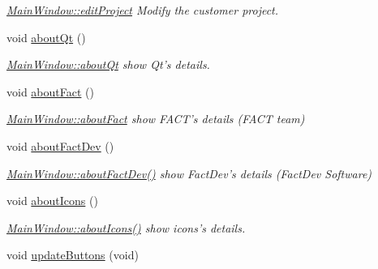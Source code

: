 \begin{DoxyCompactItemize}
\begin{DoxyCompactList}\small\item\em \hyperlink{classGui_1_1MainWindow_adade8f873eb855b2ca0bb851c91cc5a9}{Main\-Window\-::edit\-Project} Modify the customer project. \end{DoxyCompactList}\item 
\hypertarget{classGui_1_1MainWindow_a6df8072789ea8ec81ca2dd8fa78a4b01}{void \hyperlink{classGui_1_1MainWindow_a6df8072789ea8ec81ca2dd8fa78a4b01}{about\-Qt} ()}\label{classGui_1_1MainWindow_a6df8072789ea8ec81ca2dd8fa78a4b01}

\begin{DoxyCompactList}\small\item\em \hyperlink{classGui_1_1MainWindow_a6df8072789ea8ec81ca2dd8fa78a4b01}{Main\-Window\-::about\-Qt} show Qt's details. \end{DoxyCompactList}\item 
\hypertarget{classGui_1_1MainWindow_a26726203b873f41f607d78c5d5619c7d}{void \hyperlink{classGui_1_1MainWindow_a26726203b873f41f607d78c5d5619c7d}{about\-Fact} ()}\label{classGui_1_1MainWindow_a26726203b873f41f607d78c5d5619c7d}

\begin{DoxyCompactList}\small\item\em \hyperlink{classGui_1_1MainWindow_a26726203b873f41f607d78c5d5619c7d}{Main\-Window\-::about\-Fact} show F\-A\-C\-T's details (F\-A\-C\-T team) \end{DoxyCompactList}\item 
\hypertarget{classGui_1_1MainWindow_a39fe49fec47b6cbe4c8664d97bc47e0f}{void \hyperlink{classGui_1_1MainWindow_a39fe49fec47b6cbe4c8664d97bc47e0f}{about\-Fact\-Dev} ()}\label{classGui_1_1MainWindow_a39fe49fec47b6cbe4c8664d97bc47e0f}

\begin{DoxyCompactList}\small\item\em \hyperlink{classGui_1_1MainWindow_a39fe49fec47b6cbe4c8664d97bc47e0f}{Main\-Window\-::about\-Fact\-Dev()} show Fact\-Dev's details (Fact\-Dev Software) \end{DoxyCompactList}\item 
\hypertarget{classGui_1_1MainWindow_a56db09003bd79c8635488d0edc57cdb3}{void \hyperlink{classGui_1_1MainWindow_a56db09003bd79c8635488d0edc57cdb3}{about\-Icons} ()}\label{classGui_1_1MainWindow_a56db09003bd79c8635488d0edc57cdb3}

\begin{DoxyCompactList}\small\item\em \hyperlink{classGui_1_1MainWindow_a56db09003bd79c8635488d0edc57cdb3}{Main\-Window\-::about\-Icons()} show icons's details. \end{DoxyCompactList}\item 
\hypertarget{classGui_1_1MainWindow_ac71b4c99f67e10b31d9855e80a9565b7}{void \hyperlink{classGui_1_1MainWindow_ac71b4c99f67e10b31d9855e80a9565b7}{update\-Buttons} (void)}\label{classGui_1_1MainWindow_ac71b4c99f67e10b31d9855e80a9565b7}


\end{DoxyCompactItemize}
